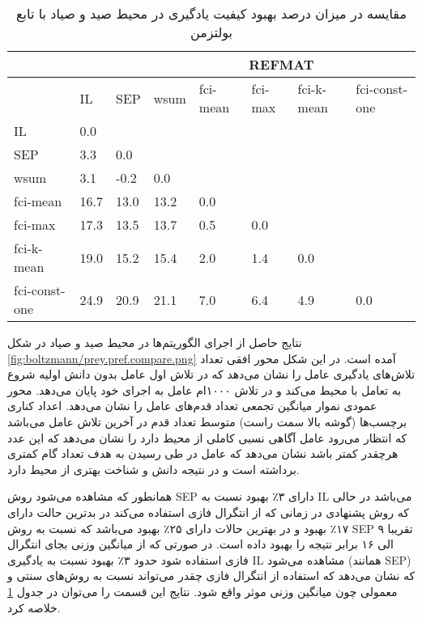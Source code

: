 

\begin{table}
\centering
\caption{مقایسه در میزان درصد بهبود کیفیت یادگیری در محیط صید و صیاد با تابع بولتزمن}\label{tab:prey_pref_compare}
\begin{latin}
\begin{tabular}{|*8{l|}}
\hline
\multicolumn{3}{|c|}{}& \multicolumn{5}{c|}{REFMAT}
\\\hline
& IL & SEP & wsum & fci-mean & fci-max & fci-k-mean & fci-const-one
\\\hline
IL &0.0 & & & & & &
\\\hline
SEP &3.3 &0.0 & & & & &
\\\hline
wsum &3.1 &-0.2 &0.0 & & & &
\\\hline
fci-mean &16.7 &13.0 &13.2 &0.0 & & &
\\\hline
fci-max &17.3 &13.5 &13.7 &0.5 &0.0 & &
\\\hline
fci-k-mean &19.0 &15.2 &15.4 &2.0 &1.4 &0.0 &
\\\hline
fci-const-one &24.9 &20.9 &21.1 &7.0 &6.4 &4.9 &0.0
\\\hline
\end{tabular}
\end{latin}
\end{table}

 نتایج حاصل از اجرای الگوریتم‌ها در محیط صید و صیاد در شکل
\ref{fig:boltzmann/prey.pref.compare.png}
آمده است. در این شکل محور افقی تعداد تلاش‌های یادگیری عامل را نشان می‌دهد که در تلاش اول عامل بدون دانش اولیه شروع به تعامل با محیط می‌کند و در تلاش ۱۰۰۰ام عامل به اجرای خود پایان می‌دهد. محور عمودی نموار میانگین تجمعی تعداد قدم‌های عامل را نشان می‌دهد. اعداد کناری برچسب‌ها (گوشه بالا سمت راست) متوسط تعداد قدم‌ در آخرین تلاش عامل می‌باشد که انتظار می‌رود عامل آگاهی نسبی کاملی از محیط دارد را نشان می‌دهد که این عدد هرچقدر کمتر باشد نشان می‌دهد که عامل در طی رسیدن به هدف تعداد گام کمتری برداشته است و در نتیجه دانش و شناخت بهتری از محیط دارد.

همانطور که مشاهده می‌شود روش SEP دارای ۳٪ بهبود نسبت به IL می‌باشد در حالی که روش پشنهادی در زمانی که از انتگرال فازی استفاده می‌کند در بدترین حالت دارای ۱۷٪ بهبود و در بهترین حالات دارای ۲۵٪ بهبود می‌باشد که نسبت به روش SEP تقریبا ۹ الی ۱۶ برابر نتیجه را بهبود داده است. در صورتی که از میانگین وزنی بجای انتگرال فازی استفاده شود حدود ۳٪ بهبود نسبت به یادگیری IL مشاهده می‌شود (همانند SEP) که نشان ‌می‌دهد که استفاده از انتگرال فازی چقدر می‌تواند نسبت به روش‌های سنتی و معمولی چون میانگین وزنی موثر واقع شود. نتایج این قسمت را می‌توان در جدول
\ref{tab:prey_pref_compare}
خلاصه کرد.

